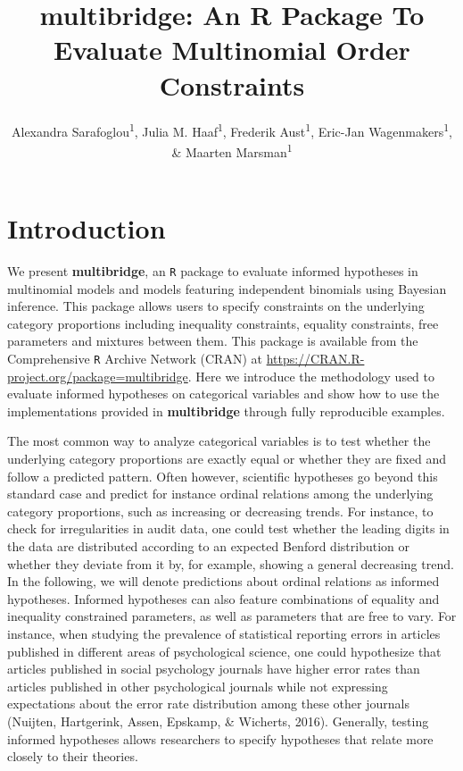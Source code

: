 \documentclass[
  english,
  man,floatsintext]{apa6}
\title{multibridge: An R Package To Evaluate Multinomial Order Constraints}
\author{Alexandra Sarafoglou\textsuperscript{1}, Julia M. Haaf\textsuperscript{1}, Frederik Aust\textsuperscript{1}, Eric-Jan Wagenmakers\textsuperscript{1}, \& Maarten Marsman\textsuperscript{1}}
\date{}
\affiliation{\vspace{0.5cm}\textsuperscript{1} University of Amsterdam}
\begin{document}
\maketitle

\hypertarget{introduction}{%
\section{Introduction}\label{introduction}}

We present \textbf{multibridge}, an \texttt{R} package to evaluate informed hypotheses in multinomial models and models featuring independent binomials using Bayesian inference. This package allows users to specify constraints on the underlying category proportions including inequality constraints, equality constraints, free parameters and mixtures between them. This package is available from the Comprehensive \texttt{R} Archive Network (CRAN) at \url{https://CRAN.R-project.org/package=multibridge}. Here we introduce the methodology used to evaluate informed hypotheses on categorical variables and show how to use the implementations provided in \textbf{multibridge} through fully reproducible examples.

The most common way to analyze categorical variables is to test whether the underlying category proportions are exactly equal or whether they are fixed and follow a predicted pattern. Often however, scientific hypotheses go beyond this standard case and predict for instance ordinal relations among the underlying category proportions, such as increasing or decreasing trends. For instance, to check for irregularities in audit data, one could test whether the leading digits in the data are distributed according to an expected Benford distribution or whether they deviate from it by, for example, showing a general decreasing trend. In the following, we will denote predictions about ordinal relations as informed hypotheses. Informed hypotheses can also feature combinations of equality and inequality constrained parameters, as well as parameters that are free to vary. For instance, when studying the prevalence of statistical reporting errors in articles published in different areas of psychological science, one could hypothesize that articles published in social psychology journals have higher error rates than articles published in other psychological journals while not expressing expectations about the error rate distribution among these other journals (Nuijten, Hartgerink, Assen, Epskamp, \& Wicherts, 2016). Generally, testing informed hypotheses allows researchers to specify hypotheses that relate more closely to their theories.
\end{document}
